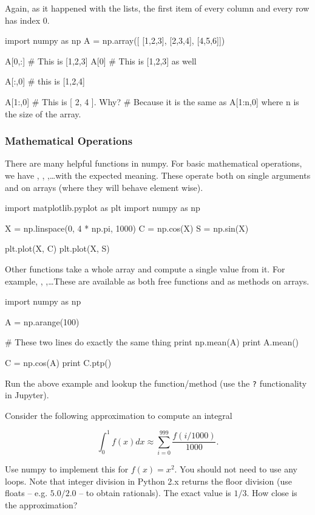\noindent Again, as it happened with the lists, the first item of every column and every row has index 0.

\begin{python}
import numpy as np
A = np.array([
    [1,2,3],
    [2,3,4],
    [4,5,6]])

A[0,:] # This is [1,2,3]
A[0] # This is [1,2,3] as well

A[:,0] # this is [1,2,4]

A[1:,0] # This is [ 2, 4 ]. Why?
        # Because it is the same as A[1:n,0] where n is the size of the array.
\end{python}

\subsubsection{Mathematical Operations}

There are many helpful functions in numpy. For basic mathematical operations, we have , , ,\ldots with the expected meaning. These operate both on single arguments and on arrays (where they will behave element wise).

\begin{python}
import matplotlib.pyplot as plt
import numpy as np

X = np.linspace(0, 4 * np.pi, 1000)
C = np.cos(X)
S = np.sin(X)

plt.plot(X, C)
plt.plot(X, S)
\end{python}

Other functions take a whole array and compute a single value from it. For example, , ,\ldots These are available as both free functions and as methods on arrays.

\begin{python}
import numpy as np

A = np.arange(100)

# These two lines do exactly the same thing
print np.mean(A)
print A.mean()

C = np.cos(A)
print C.ptp()
\end{python}

\begin{exercise}
Run the above example and lookup the  function/method (use the \texttt{?} functionality in Jupyter).
\end{exercise}


\begin{exercise}
Consider the following approximation to compute an integral

\[
\int_0^{1} f(x)dx \approx \sum_{i = 0}^{999} \frac{f(i/1000)}{1000}.
\]

Use numpy to implement this for $f(x) = x^2$. You should not need to use any loops. Note that integer division in Python 2.x returns the floor division (use floats -- e.g. $5.0/2.0$ -- to obtain rationals). The exact value is $1/3$. How close is the approximation?
\end{exercise}
